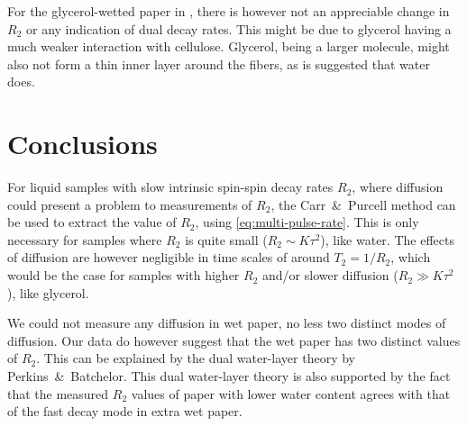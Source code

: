 \documentclass[11pt,a4paper, twocolumn,
swedish, english %
]{article}
\begin{document}
For the glycerol-wetted paper in , there is however
not an appreciable change in $R_2$ or any indication of dual
decay rates. This might be due to glycerol having a much weaker
interaction with cellulose. Glycerol, being a larger molecule, might
also not form a thin inner layer around the fibers, as is suggested
that water does. 







\section{Conclusions}


For liquid samples with slow intrinsic spin-spin decay rates $R_2$,
where diffusion could present a problem to measurements of $R_2$, the
Carr~\&~Purcell method can be used to extract the value of
$R_2$, using \eqref{eq:multi-pulse-rate}. This is only necessary for
samples where $R_2$ is quite small ($R_2\sim K\tau^2$), like
water. The effects of diffusion are however negligible in time scales
of around $T_2=1/R_2$, which would be the case for samples with higher
$R_2$ and/or slower diffusion ($R_2\gg K\tau^2$), like glycerol. 

We could not measure any diffusion in wet paper, no less two distinct
modes of diffusion. Our data do however suggest that the wet paper
has two distinct values of $R_2$. This can be explained by the dual
water-layer theory by Perkins~\&~Batchelor. This dual water-layer
theory is also supported by the fact that the measured $R_2$ values
of paper with lower water content agrees with that of the fast decay
mode in extra wet paper. 



\end{document}
